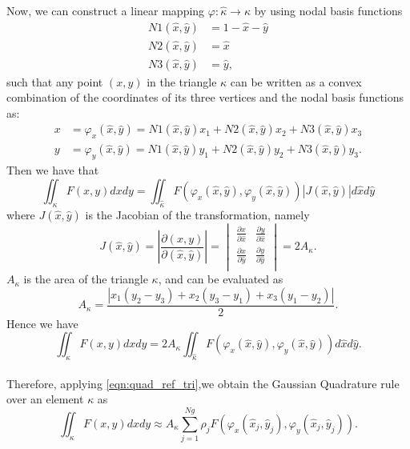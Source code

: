 \documentclass{uonmathreport}
\begin{document}
Now, we can construct a linear mapping $\varphi : \hat{\kappa} \rightarrow \kappa$ by using nodal basis functions
\begin{subequations}
	\begin{align}
		N1(\hat{x}, \hat{y}) &= 1 - \hat{x} - \hat{y}\\
		N2(\hat{x}, \hat{y}) &= \hat{x}\\
		N3(\hat{x}, \hat{y}) &= \hat{y},
	\end{align}
	\label{eqn:nodal_basis}
\end{subequations}
such that any point $(x,y)$ in the triangle $\kappa$ can be written as a convex combination of the coordinates of its three vertices and the nodal basis functions as:
\begin{subequations}
	\begin{align}
		x &= \varphi_x(\hat{x}, \hat{y}) = N1(\hat{x}, \hat{y})x_1 +N2(\hat{x}, \hat{y})x_2 + N3(\hat{x}, \hat{y})x_3\\
		y &= \varphi_y(\hat{x}, \hat{y}) = N1(\hat{x}, \hat{y})y_1 +N2(\hat{x}, \hat{y})y_2 + N3(\hat{x}, \hat{y})y_3.
	\end{align}
	\label{eqn:tri_mapping}
\end{subequations}
Then we have that
\begin{equation}
\iint_{\kappa} F(x,y) dxdy =\iint_{\hat{\kappa}} F(\varphi_x(\hat{x}, \hat{y}), \varphi_y(\hat{x}, \hat{y}))|J(\hat{x}, \hat{y})| d\hat{x} d\hat{y}
\end{equation}
where $J(\hat{x}, \hat{y})$ is the Jacobian of the transformation, namely
\begin{equation}
J(\hat{x}, \hat{y}) = \left| \frac{\partial(x,y)}{\partial(\hat{x},\hat{y})}\right| =
\begin{vmatrix}
\frac{\partial x}{\partial \hat{x}} & 
\frac{\partial y}{\partial \hat{x}} \\
\frac{\partial x}{\partial \hat{y}} &
\frac{\partial y}{\partial \hat{y}} \\
\end{vmatrix} = 2A_{\kappa}.
\end{equation}
$A_{\kappa}$ is the area of the triangle $\kappa$, and can be evaluated as
\begin{equation}
A_{\kappa} = \frac{|x_1(y_2 - y_3) + x_2(y_3-y_1)+x_3(y_1-y_2)|}{2}.
\end{equation}
Hence we have
\begin{equation}
\iint_{\kappa} F(x,y) dxdy = 2A_{\kappa}\iint_{\hat{\kappa}} F(\varphi_x(\hat{x}, \hat{y}), \varphi_y(\hat{x}, \hat{y})) d\hat{x} d\hat{y}.
\end{equation}\\
Therefore, applying \ref{eqn:quad_ref_tri},we obtain the Gaussian Quadrature rule over an element $\kappa$ as
\begin{equation}\label{eqn:gquad_elem}
\iint_{\kappa} F(x,y) dxdy \approx A_{\kappa} \sum_{j=1}^{Ng} \rho_j F(\varphi_x(\hat{x}_j, \hat{y}_j), \varphi_y(\hat{x}_j, \hat{y}_j)).
\end{equation} 
\end{document}
